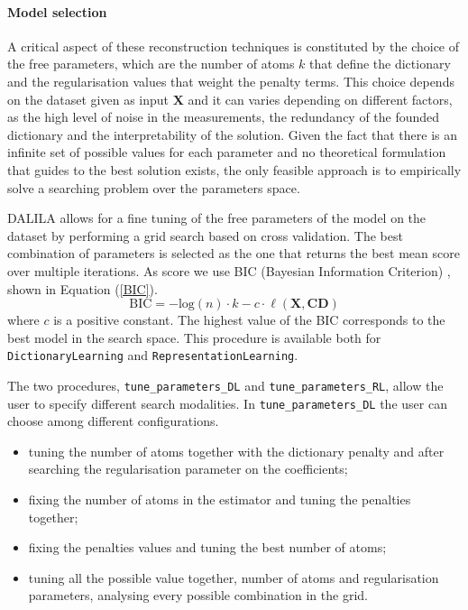 

\paragraph*{Model selection}
A critical aspect of these reconstruction techniques is constituted by the choice of the free parameters,
 which are the number of atoms $k$ that define the dictionary and the regularisation values that weight the penalty terms.
 This choice depends on the dataset given as input $\mathbf{X}$ and it can varies depending on different factors,
 as the high level of noise in the measurements, the redundancy of the founded dictionary and the interpretability
 of the solution. Given the fact that there is an infinite set of possible values for each parameter and no
 theoretical formulation that guides to the best solution exists, the only feasible approach is to empirically solve a searching problem over the parameters space.

DALILA allows for a fine tuning of the free parameters of the model on the dataset by performing a grid search based on cross validation. The best combination of parameters is selected as the one that returns the best mean score over multiple iterations. As score we use BIC (Bayesian Information Criterion) \cite{schwarz1978estimating}, shown in Equation (\ref{BIC}).
\begin{equation}\label{BIC}
\text{BIC} = - \text{log}(n)\cdot k - c \cdot \ell(\textbf{X},\textbf{CD})
\end{equation}
where $c$ is a positive constant. The highest value of the BIC corresponds to the best model in the search space.
This procedure is available both for \texttt{DictionaryLearning} and \texttt{RepresentationLearning}.

The two procedures, \texttt{tune\_parameters\_DL} and \texttt{tune\_parameters\_RL}, allow the user to specify different search modalities.
In \texttt{tune\_parameters\_DL} the user can choose among different configurations.
\begin{itemize}
\item tuning the number of atoms together with the dictionary penalty and after searching the regularisation parameter on the coefficients;
\item fixing the number of atoms in the estimator and tuning the penalties together;
\item fixing the penalties values and tuning the best number of atoms;
\item tuning all the possible value together, number of atoms and regularisation parameters, analysing every possible combination in the grid.
\end{itemize}
